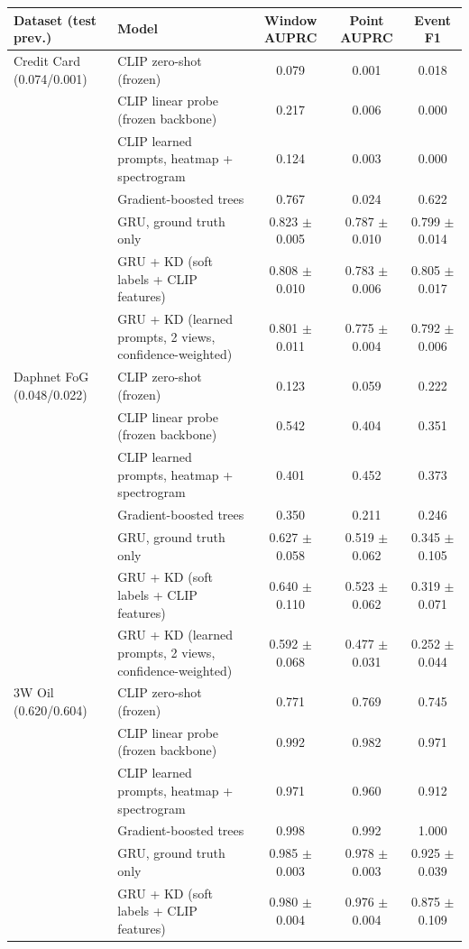 \begin{tabular}{llccc}
\toprule
Dataset (test prev.) & Model & Window AUPRC & Point AUPRC & Event F1 \\
\midrule
Credit Card (0.074/0.001) & CLIP zero-shot (frozen) & 0.079 & 0.001 & 0.018 \\
 & CLIP linear probe (frozen backbone) & 0.217 & 0.006 & 0.000 \\
 & CLIP learned prompts, heatmap + spectrogram & 0.124 & 0.003 & 0.000 \\
 & Gradient-boosted trees & 0.767 & 0.024 & 0.622 \\
 & GRU, ground truth only & 0.823 $\pm$ 0.005 & 0.787 $\pm$ 0.010 & 0.799 $\pm$ 0.014 \\
 & GRU + KD (soft labels + CLIP features) & 0.808 $\pm$ 0.010 & 0.783 $\pm$ 0.006 & 0.805 $\pm$ 0.017 \\
 & GRU + KD (learned prompts, 2 views, confidence-weighted) & 0.801 $\pm$ 0.011 & 0.775 $\pm$ 0.004 & 0.792 $\pm$ 0.006 \\
\midrule
Daphnet FoG (0.048/0.022) & CLIP zero-shot (frozen) & 0.123 & 0.059 & 0.222 \\
 & CLIP linear probe (frozen backbone) & 0.542 & 0.404 & 0.351 \\
 & CLIP learned prompts, heatmap + spectrogram & 0.401 & 0.452 & 0.373 \\
 & Gradient-boosted trees & 0.350 & 0.211 & 0.246 \\
 & GRU, ground truth only & 0.627 $\pm$ 0.058 & 0.519 $\pm$ 0.062 & 0.345 $\pm$ 0.105 \\
 & GRU + KD (soft labels + CLIP features) & 0.640 $\pm$ 0.110 & 0.523 $\pm$ 0.062 & 0.319 $\pm$ 0.071 \\
 & GRU + KD (learned prompts, 2 views, confidence-weighted) & 0.592 $\pm$ 0.068 & 0.477 $\pm$ 0.031 & 0.252 $\pm$ 0.044 \\
\midrule
3W Oil (0.620/0.604) & CLIP zero-shot (frozen) & 0.771 & 0.769 & 0.745 \\
 & CLIP linear probe (frozen backbone) & 0.992 & 0.982 & 0.971 \\
 & CLIP learned prompts, heatmap + spectrogram & 0.971 & 0.960 & 0.912 \\
 & Gradient-boosted trees & 0.998 & 0.992 & 1.000 \\
 & GRU, ground truth only & 0.985 $\pm$ 0.003 & 0.978 $\pm$ 0.003 & 0.925 $\pm$ 0.039 \\
 & GRU + KD (soft labels + CLIP features) & 0.980 $\pm$ 0.004 & 0.976 $\pm$ 0.004 & 0.875 $\pm$ 0.109 \\

\end{tabular}
